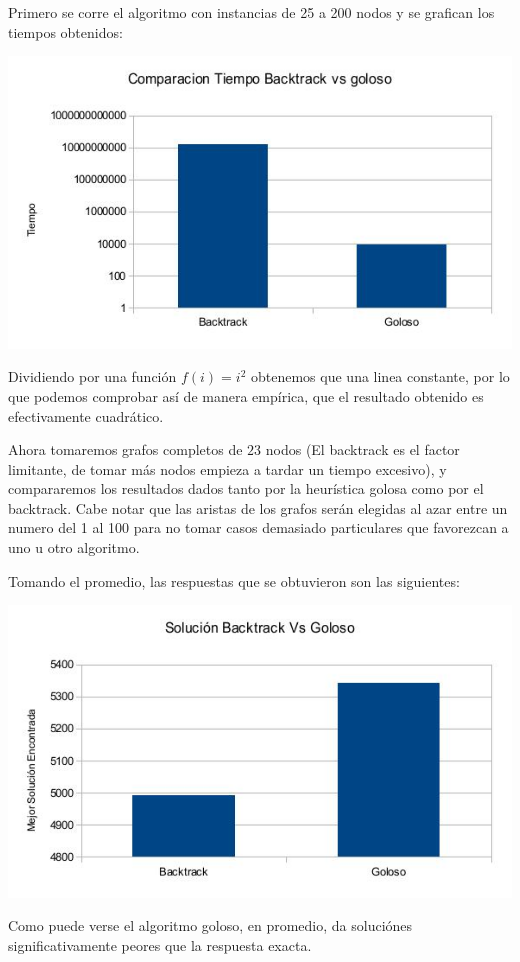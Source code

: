 Primero se corre el algoritmo con instancias de 25 a 200 nodos y se grafican los tiempos obtenidos:

\includegraphics[scale=0.5]{Ej3/tiempos.jpg}

Dividiendo por una función $f(i) = i^2$ obtenemos que una linea constante, por lo que podemos comprobar así de manera empírica, que el resultado obtenido es efectivamente cuadrático.

Ahora tomaremos grafos completos de $23$ nodos (El backtrack es el factor limitante, de tomar más nodos empieza a tardar un tiempo excesivo), y compararemos los resultados dados tanto por la heurística golosa como por el backtrack. Cabe notar que las aristas de los grafos serán elegidas al azar entre un numero del 1 al 100 para no tomar casos demasiado particulares que favorezcan a uno u otro algoritmo.

Tomando el promedio, las respuestas que se obtuvieron son las siguientes:

\includegraphics[scale=0.5]{Ej3/Soluciones.jpg}

Como puede verse el algoritmo goloso, en promedio, da soluciónes significativamente peores que la respuesta exacta.

